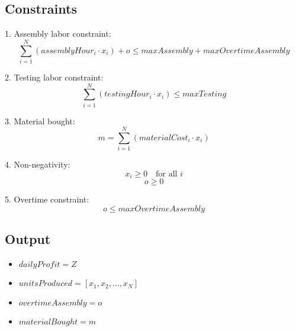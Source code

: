 \documentclass{article}
\begin{document}
\subsection*{Constraints}
1. Assembly labor constraint:
\[
\sum_{i=1}^{N} (assemblyHour_i \cdot x_i) + o \leq maxAssembly + maxOvertimeAssembly
\]

2. Testing labor constraint:
\[
\sum_{i=1}^{N} (testingHour_i \cdot x_i) \leq maxTesting
\]

3. Material bought:
\[
m = \sum_{i=1}^{N} (materialCost_i \cdot x_i)
\]

4. Non-negativity:
\[
x_i \geq 0 \quad \text{for all } i
\]
\[
o \geq 0
\]

5. Overtime constraint:
\[
o \leq maxOvertimeAssembly
\]

\subsection*{Output}
\begin{itemize}
    \item $dailyProfit = Z$
    \item $unitsProduced = [x_1, x_2, \ldots, x_N]$
    \item $overtimeAssembly = o$
    \item $materialBought = m$
\end{itemize}
\end{document}
